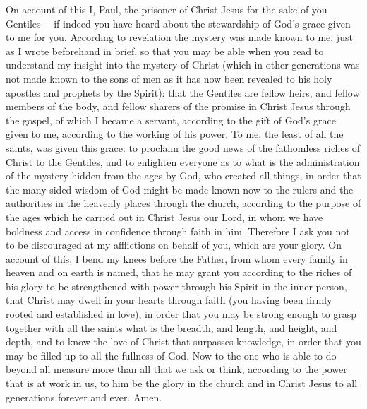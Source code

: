 \begin{biblechapter} %
 On account of this I, Paul, the prisoner of Christ Jesus for the sake of you Gentiles
\verse —if indeed you have heard about the stewardship of God’s grace given to me for you.
\verse According to revelation the mystery was made known to me, just as I wrote beforehand in brief,
\verse so that you may be able when you read to understand my insight into the mystery of Christ
\verse (which in other generations was not made known to the sons of men as it has now been revealed to his holy apostles and prophets by the Spirit):
\verse that the Gentiles are fellow heirs, and fellow members of the body, and fellow sharers of the promise in Christ Jesus through the gospel,
\verse of which I became a servant, according to the gift of God’s grace given to me, according to the working of his power.
\verse To me, the least of all the saints, was given this grace: to proclaim the good news of the fathomless riches of Christ to the Gentiles,
\verse and to enlighten everyone as to what is the administration of the mystery hidden from the ages by God, who created all things,
\verse in order that the many-sided wisdom of God might be made known now to the rulers and the authorities in the heavenly places through the church,
\verse according to the purpose of the ages which he carried out in Christ Jesus our Lord,
\verse in whom we have boldness and access in confidence through faith in him.
\verse Therefore I ask you not to be discouraged at my afflictions on behalf of you, which are your glory.
 On account of this, I bend my knees before the Father,
\verse from whom every family in heaven and on earth is named,
\verse that he may grant you according to the riches of his glory to be strengthened with power through his Spirit in the inner person,
\verse that Christ may dwell in your hearts through faith (you having been firmly rooted and established in love),
\verse in order that you may be strong enough to grasp together with all the saints what is the breadth, and length, and height, and depth,
\verse and to know the love of Christ that surpasses knowledge, in order that you may be filled up to all the fullness of God.
\verse Now to the one who is able to do beyond all measure more than all that we ask or think, according to the power that is at work in us,
\verse to him be the glory in the church and in Christ Jesus to all generations forever and ever. Amen.
\end{biblechapter}

